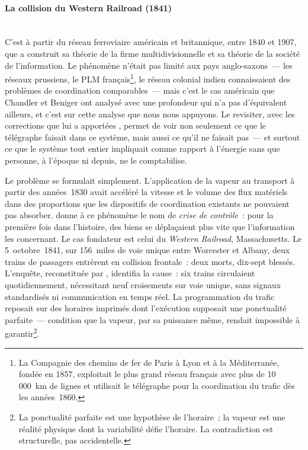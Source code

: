 \paragraph{La collision du Western Railroad (1841)}\mbox{}\\
C'est à partir du réseau ferroviaire américain et britannique, entre 1840 et 1907, que \textcite{chandler_visible_1977} a construit sa théorie de la firme multidivisionnelle et \textcite{beniger_control_1986} sa théorie de la société de l'information. Le phénomène n'était pas limité aux pays anglo-saxons~--- les réseaux prussiens, le PLM français\footnote{La Compagnie des chemins de fer de Paris à Lyon et à la Méditerranée, fondée en 1857, exploitait le plus grand réseau français avec plus de 10\,000~km de lignes et utilisait le télégraphe pour la coordination du trafic dès les années~1860.}, le réseau colonial indien connaissaient des problèmes de coordination comparables~--- mais c'est le cas américain que Chandler et Beniger ont analysé avec une profondeur qui n'a pas d'équivalent ailleurs, et c'est sur cette analyse que nous nous appuyons. Le revisiter, avec les corrections que lui a apportées \textcite{schwantes_train_2019}, permet de voir non seulement ce que le télégraphe faisait dans ce système, mais aussi ce qu'il ne faisait pas~--- et surtout ce que le système tout entier impliquait comme rapport à l'énergie sans que personne, à l'époque ni depuis, ne le comptabilise.

Le problème se formulait simplement. L'application de la vapeur au transport à partir des années~1830 avait accéléré la vitesse et le volume des flux matériels dans des proportions que les dispositifs de coordination existants ne pouvaient pas absorber. \textcite{beniger_control_1986} donne à ce phénomène le nom de \emph{crise de contrôle}~: pour la première fois dans l'histoire, %
des biens se déplaçaient plus vite que l'information les concernant. Le cas fondateur est celui du \emph{Western Railroad}, Massachusetts. Le 5~octobre~1841, sur 156~miles de voie unique entre Worcester et Albany, deux trains de passagers entrèrent en collision frontale~: deux morts, dix-sept blessés. L'enquête, reconstituée par \textcite[p.~183]{salsbury_state_1967}, identifia la cause~: six trains circulaient quotidiennement, nécessitant neuf croisements sur voie unique, sans signaux standardisés ni communication en temps réel. La programmation du trafic reposait sur des horaires imprimés dont l'exécution supposait une ponctualité parfaite~--- condition que la vapeur, par sa puissance même, rendait impossible à garantir\footnote{La ponctualité parfaite est une hypothèse de l'horaire~; la vapeur est une réalité physique dont la variabilité défie l'horaire. La contradiction est structurelle, pas accidentelle.}.

